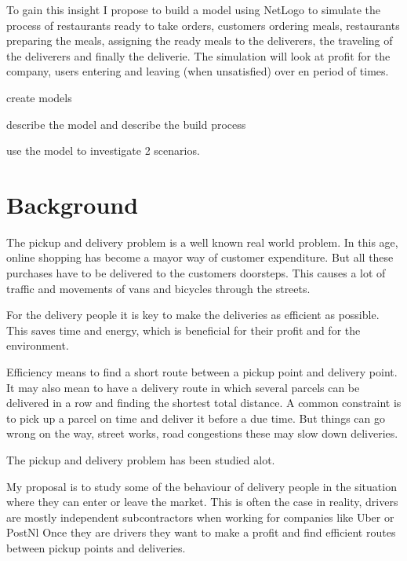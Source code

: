 To gain this insight I propose to build a model using NetLogo to simulate the process of restaurants ready to take orders, customers ordering meals,
restaurants preparing the meals, assigning the ready meals to the deliverers, the traveling of the deliverers and finally the deliverie.
The simulation will look at profit for the company, users entering and leaving (when unsatisfied) over en period of times.


create models

describe the model and describe the build process

use the model to investigate 2 scenarios.



















\section{Background}
The pickup and delivery problem is a well known real world problem.
In this age, online shopping has become a mayor way of customer expenditure.
But all these purchases have to be delivered to the customers doorsteps.
This causes a lot of traffic and movements of vans and bicycles through the streets.

For the delivery people it is key to make the deliveries as efficient as possible.
This saves time and energy, which is beneficial for their profit and for the environment.

Efficiency means to find a short route between a pickup point and delivery point.
It may also mean to have a delivery route in which several parcels can be delivered in a row and finding the shortest total distance.
A common constraint is to pick up a parcel on time and deliver it before a due time.
But things can go wrong on the way, street works, road congestions these may slow down deliveries.

The pickup and delivery problem has been studied alot.

My proposal is to study some of the behaviour of delivery people in the situation where they can enter or leave the market.
This is often the case in reality, drivers are mostly independent subcontractors when working for companies like Uber or PostNl
Once they are drivers they want to make a profit and find efficient routes between pickup points and deliveries.

